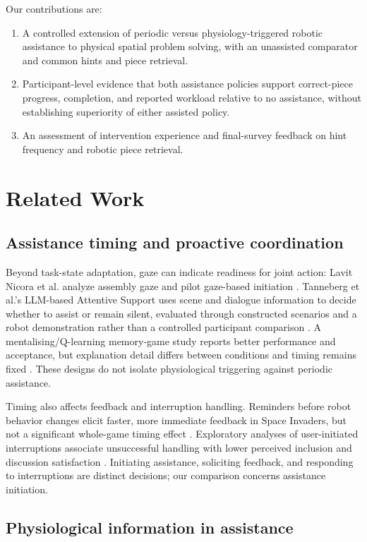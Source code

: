\documentclass[sigconf,anonymous]{aamas}
\begin{document}
Our contributions are:
\begin{enumerate}
\item A controlled extension of periodic versus physiology-triggered robotic assistance to physical spatial problem solving, with an unassisted comparator and common hints and piece retrieval.
\item Participant-level evidence that both assistance policies support correct-piece progress, completion, and reported workload relative to no assistance, without establishing superiority of either assisted policy.
\item An assessment of intervention experience and final-survey feedback on hint frequency and robotic piece retrieval.
\end{enumerate}

\section{Related Work}

\subsection{Assistance timing and proactive coordination}
Beyond task-state adaptation, gaze can indicate readiness for joint action: Lavit Nicora et al. analyze assembly gaze and pilot gaze-based initiation \cite{lavitnicora2024}. Tanneberg et al.'s LLM-based Attentive Support uses scene and dialogue information to decide whether to assist or remain silent, evaluated through constructed scenarios and a robot demonstration rather than a controlled participant comparison \cite{tanneberg2024}. A mentalising/Q-learning memory-game study reports better performance and acceptance, but explanation detail differs between conditions and timing remains fixed \cite{andriella2025mentalising}. These designs do not isolate physiological triggering against periodic assistance.

Timing also affects feedback and interruption handling. Reminders before robot behavior changes elicit faster, more immediate feedback in Space Invaders, but not a significant whole-game timing effect \cite{candon2023}. Exploratory analyses of user-initiated interruptions associate unsuccessful handling with lower perceived inclusion and discussion satisfaction \cite{cao2025}. Initiating assistance, soliciting feedback, and responding to interruptions are distinct decisions; our comparison concerns assistance initiation.

\subsection{Physiological information in assistance}
\end{document}
